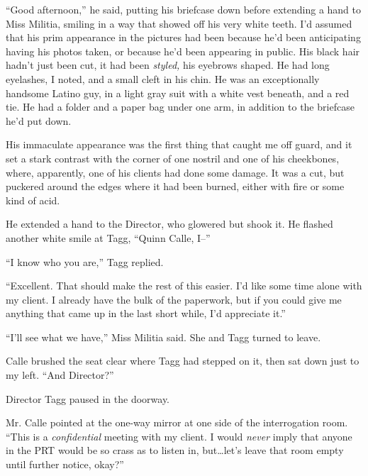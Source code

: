 ``Good afternoon,'' he said, putting his briefcase down before extending a hand to Miss Militia, smiling in a way that showed off his very white teeth.  I'd assumed that his prim appearance in the pictures had been because he'd been anticipating having his photos taken, or because he'd been appearing in public.  His black hair hadn't just been cut, it had been \emph{styled,} his eyebrows shaped.  He had long eyelashes, I noted, and a small cleft in his chin.  He was an exceptionally handsome Latino guy, in a light gray suit with a white vest beneath, and a red tie.  He had a folder and a paper bag under one arm, in addition to the briefcase he'd put down.



His immaculate appearance was the first thing that caught me off guard, and it set a stark contrast with the corner of one nostril and one of his cheekbones, where, apparently, one of his clients had done some damage.  It was a cut, but puckered around the edges where it had been burned, either with fire or some kind of acid.



He extended a hand to the Director, who glowered but shook it.  He flashed another white smile at Tagg, ``Quinn Calle, I--''



``I know who you are,'' Tagg replied.



``Excellent.  That should make the rest of this easier.  I'd like some time alone with my client.  I already have the bulk of the paperwork, but if you could give me anything that came up in the last short while, I'd appreciate it.''



``I'll see what we have,'' Miss Militia said.  She and Tagg turned to leave.



Calle brushed the seat clear where Tagg had stepped on it, then sat down just to my left.  ``And Director?''



Director Tagg paused in the doorway.



Mr. Calle pointed at the one-way mirror at one side of the interrogation room.  ``This is a \emph{confidential} meeting with my client.  I would \emph{never} imply that anyone in the PRT would be so crass as to listen in, but\ldots let's leave that room empty until further notice, okay?''



